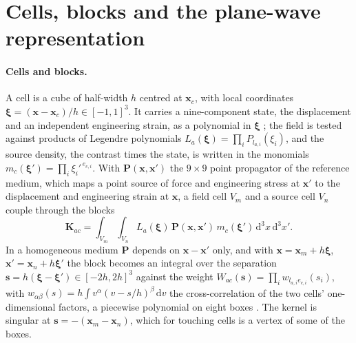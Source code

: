 \documentclass[11pt,a4paper]{article}
\newcommand{\bK}{\mathbf{K}}
\newcommand{\bP}{\mathbf{P}}
\newcommand{\bx}{\mathbf{x}}
\newcommand{\bs}{\mathbf{s}}
\newcommand{\bxi}{\boldsymbol{\xi}}
\newcommand{\dd}{\mathrm{d}}
\begin{document}
\section{Cells, blocks and the plane-wave representation}\label{sec:planewaves}

\paragraph{Cells and blocks.} A cell is a cube of half-width $h$ centred at $\bx_c$, with local coordinates
$\bxi=(\bx-\bx_c)/h\in[-1,1]^3$. It carries a nine-component state, the displacement and an independent
engineering strain, as a polynomial in $\bxi$ \citep{NestorLegendre2026}; the field is tested against products
of Legendre polynomials $L_a(\bxi)=\prod_iP_{l_{a,i}}(\xi_i)$, and the source density, the contrast times the
state, is written in the monomials $m_c(\bxi')=\prod_i\xi_i'^{\,e_{c,i}}$. With $\bP(\bx,\bx')$ the
$9\times9$ point propagator of the reference medium, which maps a point source of force and engineering
stress at $\bx'$ to the displacement and engineering strain at $\bx$, a field cell $V_m$ and a source cell
$V_n$ couple through the blocks
\begin{equation}\label{eq:block}
  \bK_{ac}=\int_{V_m}\!\int_{V_n}L_a(\bxi)\,\bP(\bx,\bx')\,m_c(\bxi')\,\dd^3x\,\dd^3x'.
\end{equation}
In a homogeneous medium $\bP$ depends on $\bx-\bx'$ only, and with $\bx=\bx_m+h\bxi$, $\bx'=\bx_n+h\bxi'$ the
block becomes an integral over the separation $\bs=h(\bxi-\bxi')\in[-2h,2h]^3$ against the weight
$W_{ac}(\bs)=\prod_iw_{l_{a,i}e_{c,i}}(s_i)$, with $w_{\alpha\beta}(s)=h\int v^\alpha(v-s/h)^\beta\,\dd v$ the
cross-correlation of the two cells' one-dimensional factors, a piecewise polynomial on eight boxes
\citep{NestorCoupling2026}. The kernel is singular at $\bs=-(\bx_m-\bx_n)$, which for touching cells is a
vertex of some of the boxes.
\end{document}
